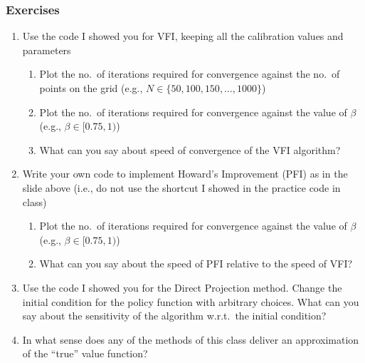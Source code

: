 \documentclass[10pt, aspectratio=1610, handout]{beamer}
\begin{document}
  \begin{frame}
    \frametitle{Exercises}

    \begin{enumerate}
      \item Use the code I showed you for VFI, keeping all the calibration values and parameters
        \begin{enumerate}
          \item Plot the no.~of iterations required for convergence against the no.~of points on the grid (e.g., $N \in \{50, 100, 150, \ldots, 1000\}$)
          \item Plot the no.~of iterations required for convergence against the value of $\beta$ (e.g., $\beta \in [0.75, 1)$)
          \item What can you say about speed of convergence of the VFI algorithm?
        \end{enumerate}
      \vfill
      \item Write your own code to implement Howard's Improvement (PFI) as in the slide above (i.e., do not use the shortcut I showed in the practice code in class)
        \begin{enumerate}
          \item Plot the no.~of iterations required for convergence against the value of $\beta$ (e.g., $\beta \in [0.75, 1)$)
          \item What can you say about the speed of PFI relative to the speed of VFI?
        \end{enumerate}
      \vfill
      \item Use the code I showed you for the Direct Projection method. Change the initial condition for the policy function with arbitrary choices. What can you say about the sensitivity of the algorithm w.r.t.~the initial condition?
      \vfill
      \item In what sense does any of the methods of this class deliver an approximation of the ``true'' value function?
    \end{enumerate}

  \end{frame}


  \appendix
\end{document}
